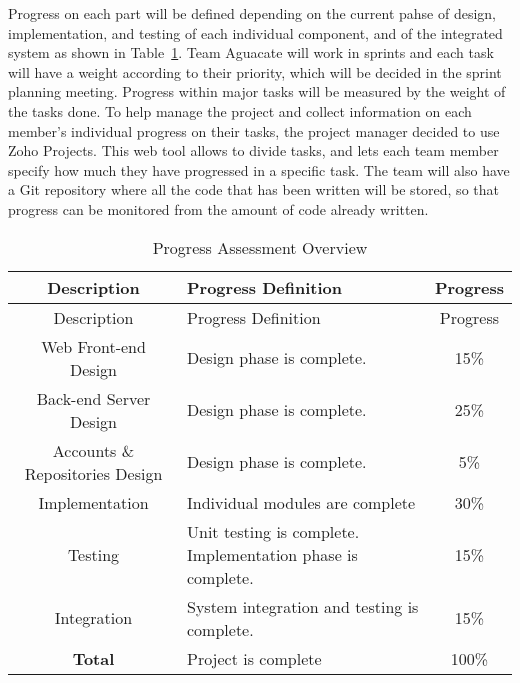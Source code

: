 
Progress on each part will be defined depending on the current pahse of design, implementation, and testing of each individual component, and of the integrated system as shown in Table~\ref{asses}. Team Aguacate will work in sprints and each task
will have a weight according to their priority, which will be decided in the
sprint planning meeting. Progress within major tasks will be measured by the weight of
the tasks done. To help manage the project and collect information on each member's individual
progress on their tasks, the project manager decided to use Zoho Projects. This
web tool allows to divide tasks, and lets each team member specify how much they have
progressed in a specific task. The team will also have a Git repository where
all the code that has been written will be stored, so that progress can be
monitored from the amount of code already written.

\setlength{\extrarowheight}{1.5pt}
  \begin{longtable}{|c|m{7.5cm}|c|}
 \caption{Progress Assessment Overview \label{asses}} \\
   \hline
  
  \centering Description & Progress Definition & Progress \\
  \hline \hline \endfirsthead
  
     \hline

	\centering Description & Progress Definition & Progress \\
  \hline \hline \endhead
  
  \endfoot  
  
  Web Front-end Design & Design phase is complete. & 15\%\\ \hline   
  Back-end Server Design & Design phase is complete. & 25\%\\ \hline   
  Accounts \& Repositories Design & Design phase is complete. & 5\%\\ \hline 
  Implementation & Individual modules are complete & 30\%\\ \hline 
  Testing & Unit testing is complete. Implementation phase is complete. & 15\%\\ \hline
  Integration & System integration and testing is complete. & 15\%\\ \hline
  \textbf{Total} & Project is complete & 100\% \\ \hline   
  \end{longtable}